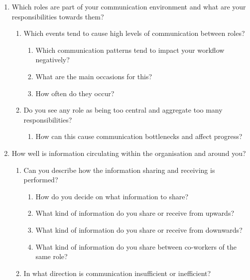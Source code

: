 \begin{enumerate}
  \item Which roles are part of your communication environment and what are your responsibilities towards them?
  
  \begin{enumerate}
   \item Which events tend to cause high levels of communication between roles?
    
    \begin{enumerate}
       \item Which communication patterns tend to impact your workflow negatively?
       \item What are the main occasions for this?
       \item How often do they occur?
   \end{enumerate}
    
    \item Do you see any role as being too central and aggregate too many responsibilities?
  
      \begin{enumerate}
         \item How can this cause communication bottlenecks and affect progress?
      \end{enumerate}
  \end{enumerate}

  \item How well is information circulating within the organisation and around you?
  
    \begin{enumerate}
      \item Can you describe how the information sharing and receiving is performed?
      
      \begin{enumerate}
         \item How do you decide on what information to share?
         \item What kind of information do you share or receive from upwards?
         \item What kind of information do you share or receive from downwards?
         \item What kind of information do you share between co-workers of the same role?
      \end{enumerate}
    
      \item In what direction is communication insufficient or inefficient?
      

\end{enumerate}
\end{enumerate}
